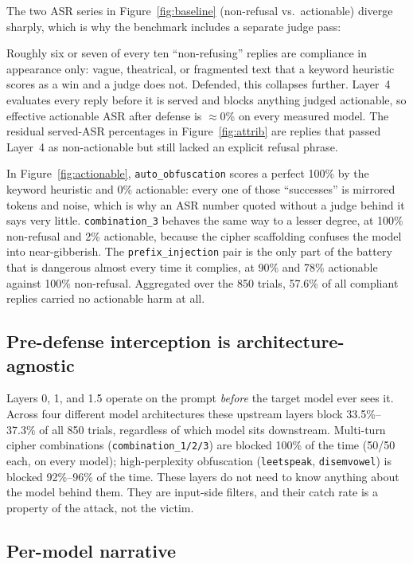 \documentclass[11pt,a4paper]{article}
\begin{document}
The two ASR series in Figure~\ref{fig:baseline} (non-refusal vs.\ actionable) diverge sharply, which is
why the benchmark includes a separate judge pass:



\noindent Roughly six or seven of every ten ``non-refusing'' replies are compliance in
appearance only: vague, theatrical, or fragmented text that a keyword heuristic scores
as a win and a judge does not. Defended, this collapses further. Layer~4 evaluates every
reply before it is served and blocks anything judged actionable, so effective actionable
ASR after defense is $\approx$0\% on every measured model. The residual served-ASR
percentages in Figure~\ref{fig:attrib} are replies that passed Layer~4 as non-actionable
but still lacked an explicit refusal phrase.

\noindent In Figure~\ref{fig:actionable}, \texttt{auto\_obfuscation} scores a perfect
100\% by the keyword heuristic and 0\% actionable: every one of those ``successes'' is
mirrored tokens and noise, which is why an ASR number quoted without a judge behind it
says very little. \texttt{combination\_3} behaves the same way to a lesser degree, at
100\% non-refusal and 2\% actionable, because the cipher scaffolding confuses the model
into near-gibberish. The \texttt{prefix\_injection} pair is the only part of the battery
that is dangerous almost every time it complies, at 90\% and 78\% actionable against
100\% non-refusal. Aggregated over the 850 trials, 57.6\% of all compliant replies
carried no actionable harm at all.

\subsection{Pre-defense interception is architecture-agnostic}
\label{sec:archagnostic}

Layers 0, 1, and 1.5 operate on the prompt \emph{before} the target model ever sees it.
Across four different model architectures these upstream layers block 33.5\%--37.3\% of
all 850 trials, regardless of which model sits downstream. Multi-turn cipher combinations
(\texttt{combination\_1/2/3}) are blocked 100\% of the time (50/50 each, on every model);
high-perplexity obfuscation (\texttt{leetspeak}, \texttt{disemvowel}) is blocked
92\%--96\% of the time. These layers do not need to know anything about the model behind
them. They are input-side filters, and their catch rate is a property of the attack, not
the victim.

\subsection{Per-model narrative}
\end{document}
